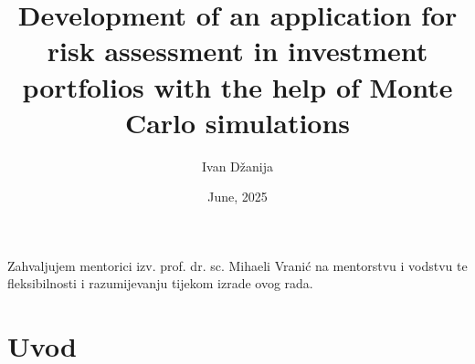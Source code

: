 \documentclass[zavrsnirad, upload]{fer}
\title{Development of an application for risk assessment in investment
portfolios with the help of Monte Carlo simulations}
\author{Ivan Džanija}
\date{June, 2025}
\begin{document}
\renewcommand{\lstlistingname}{Kod}
\renewcommand{\thelstlisting}{\thesection\arabic{lstlisting}}

\maketitle




\begin{zahvale}
    Zahvaljujem mentorici izv. prof. dr. sc. Mihaeli Vranić na mentorstvu i
    vodstvu te fleksibilnosti i razumijevanju tijekom izrade ovog rada.
\end{zahvale}

\mainmatter

\tableofcontents

\chapter{Uvod}
\label{pog:uvod}
\end{document}
